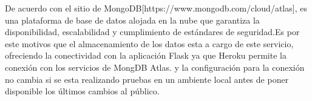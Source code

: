 De acuerdo con el sitio de MongoDB[https://www.mongodb.com/cloud/atlas], es una plataforma de base de datos alojada en la nube  que garantiza la disponibilidad, escalabilidad y cumplimiento de estándares de seguridad.Es por este motivos que el almacenamiento de los datos esta a cargo de este servicio, ofreciendo la conectividad con la aplicación Flask ya que Heroku permite la conexión con los servicios de MongDB Atlas. y la configuración para la conexión no cambia si se esta realizando pruebas en un ambiente local antes de poner disponible los últimos cambios al público.